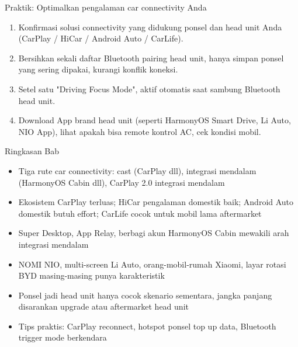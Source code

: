 \begin{tcbpractice}{Praktik: Optimalkan pengalaman car connectivity Anda}
\begin{enumerate}
  \item Konfirmasi solusi connectivity yang didukung ponsel dan head unit Anda (CarPlay / HiCar / Android Auto / CarLife).
  \item Bersihkan sekali daftar Bluetooth pairing head unit, hanya simpan ponsel yang sering dipakai, kurangi konflik koneksi.
  \item Setel satu "Driving Focus Mode", aktif otomatis saat sambung Bluetooth head unit.
  \item Download App brand head unit (seperti HarmonyOS Smart Drive, Li Auto, NIO App), lihat apakah bisa remote kontrol AC, cek kondisi mobil.
\end{enumerate}

\end{tcbpractice}

\begin{tcbsummary}{Ringkasan Bab}
\begin{itemize}
  \item Tiga rute car connectivity: cast (CarPlay dll), integrasi mendalam (HarmonyOS Cabin dll), CarPlay 2.0 integrasi mendalam
  \item Ekosistem CarPlay terluas; HiCar pengalaman domestik baik; Android Auto domestik butuh effort; CarLife cocok untuk mobil lama aftermarket
  \item Super Desktop, App Relay, berbagi akun HarmonyOS Cabin mewakili arah integrasi mendalam
  \item NOMI NIO, multi-screen Li Auto, orang-mobil-rumah Xiaomi, layar rotasi BYD masing-masing punya karakteristik
  \item Ponsel jadi head unit hanya cocok skenario sementara, jangka panjang disarankan upgrade atau aftermarket head unit
  \item Tips praktis: CarPlay reconnect, hotspot ponsel top up data, Bluetooth trigger mode berkendara
\end{itemize}

\end{tcbsummary}
